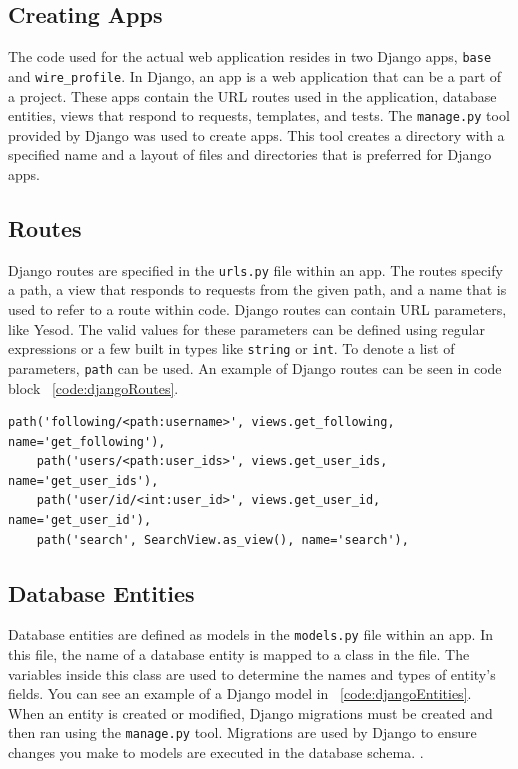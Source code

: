 \subsection{Creating Apps}

The code used for the actual web application resides in two Django apps, \texttt{base} and
\texttt{wire\_profile}. In Django, an app is a web application that can be a part of a project.
These apps contain the URL routes used in the application, database entities, views
that respond to requests, templates, and tests. The \texttt{manage.py} tool provided
by Django was used to create apps. This tool creates a directory with a specified name
and a layout of files and directories that is preferred for Django apps. \parencite{djangoIntroDocs}

\subsection{Routes}

Django routes are specified in the \texttt{urls.py} file within an app. The routes
specify a path, a view that responds to requests from the given path, and a name
that is used to refer to a route within code. Django routes can contain URL parameters,
like Yesod. The valid values for these parameters can be defined using regular expressions
or a few built in types like \texttt{string} or \texttt{int}. To denote a list of parameters,
\texttt{path} can be used. An example of Django routes can be seen in code block ~\ref{code:djangoRoutes}.


\begin{lstlisting}[caption={An extract of Django routes},label={code:djangoRoutes}]
    path('following/<path:username>', views.get_following, name='get_following'),
    path('users/<path:user_ids>', views.get_user_ids, name='get_user_ids'),
    path('user/id/<int:user_id>', views.get_user_id, name='get_user_id'),
    path('search', SearchView.as_view(), name='search'),
\end{lstlisting}

\subsection{Database Entities}

Database entities are defined as models in the \texttt{models.py} file within an app.
In this file, the name of a database entity is mapped to a class in the file. The variables inside
this class are used to determine the names and types of entity's fields. You can see
an example of a Django model in ~\ref{code:djangoEntities}. When an entity is created 
or modified, Django migrations must be created and then ran using the \texttt{manage.py} tool. 
Migrations are used by Django to ensure changes you make to models are executed in 
the database schema. \parencite{djangoMigrations}.

